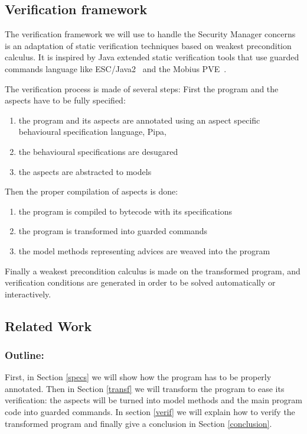 \subsection{Verification framework}
\label{framework}
The verification framework we will use to handle the Security Manager concerns 
is an adaptation of static verification techniques based on weakest
precondition calculus. It is inspired by Java extended static verification
tools that use guarded commands language like ESC/Java2~\cite{CokK04} and
the Mobius PVE~\cite{MobiusPVE07}.


The verification process is made of several steps:
First the program and the aspects have to be fully specified:
\begin{enumerate}
\item the program and its aspects are annotated using an aspect specific
behavioural specification language, Pipa,
\item the behavioural specifications are desugared
\item the aspects are abstracted to models
\end{enumerate}
Then the proper compilation of aspects is done:
\begin{enumerate}
\item the program is compiled to bytecode with its specifications
\item the program is transformed into guarded commands
\item the model methods representing advices are weaved into the program
\end{enumerate}
Finally a weakest precondition calculus is made on the transformed
program, and verification conditions are generated in order to be
solved automatically or interactively.

\vspace{-0.4cm}
\subsection{Related Work}
\label{related}


\vspace{-0.4cm}
\subsubsection{Outline:}
First, in Section \ref{specs} we will show how the program has to be
 properly annotated. Then in Section \ref{transf} we will
transform the program to ease its verification: the aspects will be turned
into model methods and the main program code into guarded commands.
In section \ref{verif} we will explain how to verify the transformed program
and finally give a conclusion in Section \ref{conclusion}.

